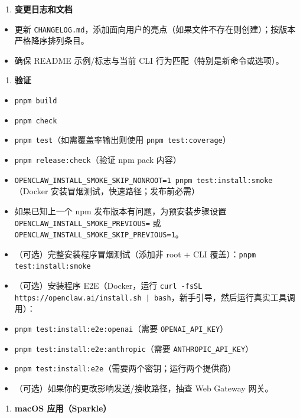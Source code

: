 \begin{enumerate}
  \item \textbf{变更日志和文档}
\end{enumerate}


\begin{itemize}
  \item [ ] 更新 \texttt{CHANGELOG.md}，添加面向用户的亮点（如果文件不存在则创建）；按版本严格降序排列条目。
  \item [ ] 确保 README 示例/标志与当前 CLI 行为匹配（特别是新命令或选项）。
\end{itemize}


\begin{enumerate}
  \item \textbf{验证}
\end{enumerate}


\begin{itemize}
  \item [ ] \texttt{pnpm build}
  \item [ ] \texttt{pnpm check}
  \item [ ] \texttt{pnpm test}（如需覆盖率输出则使用 \texttt{pnpm test:coverage}）
  \item [ ] \texttt{pnpm release:check}（验证 npm pack 内容）
  \item [ ] \texttt{OPENCLAW\_INSTALL\_SMOKE\_SKIP\_NONROOT=1 pnpm test:install:smoke}（Docker 安装冒烟测试，快速路径；发布前必需）
  \item 如果已知上一个 npm 发布版本有问题，为预安装步骤设置 \texttt{OPENCLAW\_INSTALL\_SMOKE\_PREVIOUS=} 或 \texttt{OPENCLAW\_INSTALL\_SMOKE\_SKIP\_PREVIOUS=1}。
  \item [ ]（可选）完整安装程序冒烟测试（添加非 root + CLI 覆盖）：\texttt{pnpm test:install:smoke}
  \item [ ]（可选）安装程序 E2E（Docker，运行 \texttt{curl -fsSL https://openclaw.ai/install.sh | bash}，新手引导，然后运行真实工具调用）：
  \item \texttt{pnpm test:install:e2e:openai}（需要 \texttt{OPENAI\_API\_KEY}）
  \item \texttt{pnpm test:install:e2e:anthropic}（需要 \texttt{ANTHROPIC\_API\_KEY}）
  \item \texttt{pnpm test:install:e2e}（需要两个密钥；运行两个提供商）
  \item [ ]（可选）如果你的更改影响发送/接收路径，抽查 Web Gateway 网关。
\end{itemize}


\begin{enumerate}
  \item \textbf{macOS 应用（Sparkle）}
\end{enumerate}


